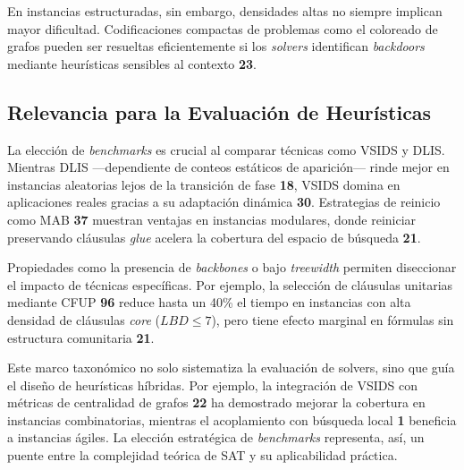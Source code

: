 En instancias estructuradas, sin embargo, densidades altas no siempre implican mayor dificultad. Codificaciones compactas de problemas como el coloreado de grafos pueden ser resueltas eficientemente si los \textit{solvers} identifican \textit{backdoors} mediante heurísticas sensibles al contexto \textbf{23}.

\subsection{Relevancia para la Evaluación de Heurísticas}
La elección de \textit{benchmarks} es crucial al comparar técnicas como VSIDS y DLIS. Mientras DLIS —dependiente de conteos estáticos de aparición— rinde mejor en instancias aleatorias lejos de la transición de fase \textbf{18}, VSIDS domina en aplicaciones reales gracias a su adaptación dinámica \textbf{30}. Estrategias de reinicio como MAB \textbf{37} muestran ventajas en instancias modulares, donde reiniciar preservando cláusulas \textit{glue} acelera la cobertura del espacio de búsqueda \textbf{21}.

Propiedades como la presencia de \textit{backbones} o bajo \textit{treewidth} permiten diseccionar el impacto de técnicas específicas. Por ejemplo, la selección de cláusulas unitarias mediante CFUP \textbf{96} reduce hasta un 40\% el tiempo en instancias con alta densidad de cláusulas \textit{core} ($LBD \leq 7$), pero tiene efecto marginal en fórmulas sin estructura comunitaria \textbf{21}.


Este marco taxonómico no solo sistematiza la evaluación de solvers, sino que guía el diseño de heurísticas híbridas. Por ejemplo, la integración de VSIDS con métricas de centralidad de grafos \textbf{22} ha demostrado mejorar la cobertura en instancias combinatorias, mientras el acoplamiento con búsqueda local \textbf{1} beneficia a instancias ágiles. La elección estratégica de \textit{benchmarks} representa, así, un puente entre la complejidad teórica de SAT y su aplicabilidad práctica.














